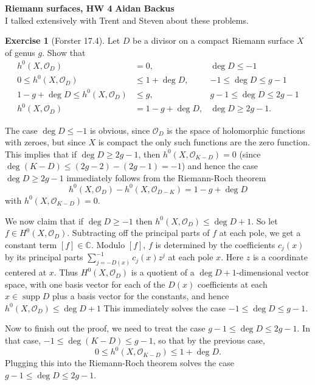 \documentclass[10pt]{article}
\newcommand{\CC}{\mathbb{C}}
\newcommand{\supp}{\operatorname{supp}}
\newcommand{\Olo}{\mathscr O}
\theoremstyle{definition}
\newtheorem{exer}{Exercise}
\begin{document}
\noindent
\large\textbf{Riemann surfaces, HW 4} \hfill \textbf{Aidan Backus} \\

I talked extensively with Trent and Steven about these problems.

\begin{exer}[Forster 17.4]
Let $D$ be a divisor on a compact Riemann surface $X$ of genus $g$. Show that
\begin{align*}
h^0(X, \Olo_D) &=0, &\deg D \leq -1\\
0 \leq h^0(X, \Olo_D) &\leq 1 + \deg D, &-1 \leq \deg D \leq g - 1\\
1 - g + \deg D \leq h^0(X, \Olo_D) &\leq g, &g - 1 \leq \deg D \leq 2g - 1\\
h^0(X, \Olo_D) &= 1 - g + \deg D, &\deg D \geq 2g - 1.
\end{align*}
\end{exer}

The case $\deg D \leq -1$ is obvious, since $\Olo_D$ is the space of holomorphic functions with zeroes, but since $X$ is compact the only such functions are the zero function.
This implies that if $\deg D \geq 2g - 1$, then $h^0(X, \Olo_{K - D}) = 0$ (since $\deg(K - D) \leq (2g - 2) - (2g - 1) = -1$) and hence the case $\deg D \geq 2g - 1$ immediately follows from the Riemann-Roch theorem
$$h^0(X, \Olo_D) - h^0(X, \Olo_{D - K}) = 1 - g + \deg D$$
with $h^0(X, \Olo_{K - D}) = 0$.

We now claim that if $\deg D \geq -1$ then $h^0(X, \Olo_D) \leq \deg D + 1$.
So let $f \in H^0(X, \Olo_D)$. Subtracting off the principal parts of $f$ at each pole, we get a constant term $[f] \in \CC$.
Modulo $[f]$, $f$ is determined by the coefficients $c_j(x)$ by its principal parts $\sum_{j=-D(x)}^{-1} c_j(x) z^j$ at each pole $x$. Here $z$ is a coordinate centered at $x$.
Thus $H^0(X, \Olo_D)$ is a quotient of a $\deg D + 1$-dimensional vector space, with one basis vector for each of the $D(x)$ coefficients at each $x \in \supp D$ plus a basis vector for the constants, and hence $h^0(X, \Olo_D) \leq \deg D + 1$
This immediately solves the case $-1 \leq \deg D \leq g - 1$.

Now to finish out the proof, we need to treat the case $g - 1 \leq \deg D \leq 2g - 1$.
In that case, $-1 \leq \deg(K - D) \leq g - 1$, so that by the previous case,
$$0 \leq h^0(X, \Olo_{K - D}) \leq 1 + \deg D.$$
Plugging this into the Riemann-Roch theorem solves the case $g - 1 \leq \deg D \leq 2g - 1$.
\end{document}
